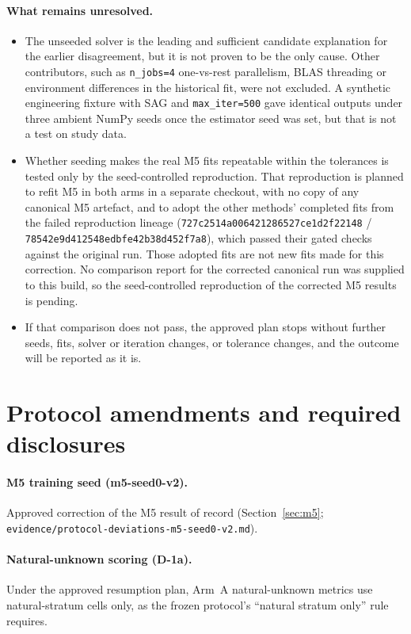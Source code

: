\documentclass[11pt]{article}
\newcommand{\failrunid}{\nolinkurl{78542e9d412548edbfe42b38d452f7a8}}
\newcommand{\code}[1]{\texttt{#1}}
\newif\ifctreport
\newcommand{\Reprostatus}{\ifctreport A seed-controlled reproduction of the corrected M5 results was run and compared with the corrected canonical run by the repository's tiered comparison; that internal comparison reports overall status ``\ctres{comparison}{report}{overall}''. This is an internal tolerance comparison by the same pipeline, not independent verification\else No comparison report for the corrected canonical run was supplied to this build, so the seed-controlled reproduction of the corrected M5 results is pending\fi}
\begin{document}
\paragraph{What remains unresolved.}
\begin{itemize}
\item The unseeded solver is the leading and sufficient candidate explanation for the earlier disagreement, but it is not proven to be the only cause. Other contributors, such as \code{n\_jobs=4} one-vs-rest parallelism, BLAS threading or environment differences in the historical fit, were not excluded. A synthetic engineering fixture with SAG and \code{max\_iter=500} gave identical outputs under three ambient NumPy seeds once the estimator seed was set, but that is not a test on study data.
\item Whether seeding makes the real M5 fits repeatable within the tolerances is tested only by the seed-controlled reproduction. That reproduction is planned to refit M5 in both arms in a separate checkout, with no copy of any canonical M5 artefact, and to adopt the other methods' completed fits from the failed reproduction lineage (\nolinkurl{727c2514a006421286527ce1d2f22148} / \failrunid), which passed their gated checks against the original run. Those adopted fits are not new fits made for this correction. \Reprostatus.
\item If that comparison does not pass, the approved plan stops without further seeds, fits, solver or iteration changes, or tolerance changes, and the outcome will be reported as it is.
\end{itemize}

\section{Protocol amendments and required disclosures}\label{sec:amend}

\paragraph{M5 training seed (m5-seed0-v2).} Approved correction of the M5 result of record (Section~\ref{sec:m5}; \nolinkurl{evidence/protocol-deviations-m5-seed0-v2.md}).

\paragraph{Natural-unknown scoring (D-1a).} Under the approved resumption plan, Arm~A natural-unknown metrics use natural-stratum cells only, as the frozen protocol's ``natural stratum only'' rule requires.
\end{document}
